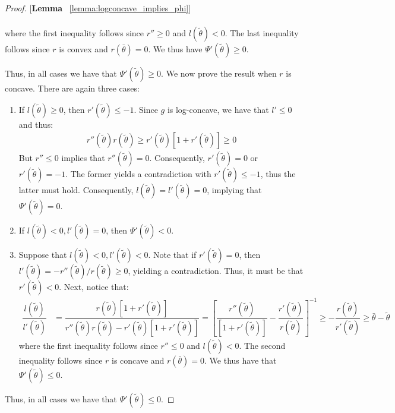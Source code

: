 \begin{proof}{[\textbf{Lemma} ~\ref{lemma:logconcave_implies_phi}]}
\begin{enumerate}[label=(\arabic*),ref=\thelemma(\arabic*)]
\begin{align*}
   \end{align*}
   where the first inequality follows since $r''\geq 0$ and $l(\tilde{\theta})<0$. The last inequality follows since $r$ is convex and $r(\bar{\theta})=0$. We thus have $\Psi'(\tilde{\theta})\geq 0$. 
\end{enumerate}
Thus, in all cases we have that $\Psi'(\tilde{\theta})\geq 0$. We now prove the result when $r$ is concave. There are again three cases:
\vspace{-5pt}
\begin{enumerate}[label=(\arabic*),ref=\thelemma(\arabic*)]
   \item If $l(\tilde{\theta})\geq 0$, then $r'(\tilde{\theta})\leq -1$. Since $g$ is log-concave, we have that $l'\leq0$ and thus: 
   \begin{align*}
      r''(\tilde{\theta})r(\tilde{\theta})\geq r'(\tilde{\theta})[1+r'(\tilde{\theta})] \geq 0
   \end{align*}
   But $r''\leq 0$ implies that $r''(\tilde{\theta}) = 0$. Consequently, $r'(\tilde{\theta}) = 0$ or $r'(\tilde{\theta})=-1$. The former yields a contradiction with $r'(\tilde{\theta})\leq -1$, thus the latter must hold. Consequently, $l(\tilde{\theta})=l'(\tilde{\theta})=0$, implying that $\Psi'(\tilde{\theta})=0$. 
   \item If $l(\tilde{\theta})<0,l'(\tilde{\theta})=0$, then $\Psi'(\tilde{\theta})<0$. 
   \item Suppose that $l(\tilde{\theta})<0,l'(\tilde{\theta})<0$. Note that if $r'(\tilde{\theta})=0$, then $l'(\tilde{\theta}) = -r''(\tilde{\theta})/r(\tilde{\theta})\geq 0$, yielding a contradiction. Thus, it must be that $r'(\tilde{\theta})<0$. Next, notice that:
   \begin{align*}
      \dfrac{l(\tilde{\theta})}{l'(\tilde{\theta})} &= \dfrac{r(\tilde{\theta})[1+r'(\tilde{\theta})]}{r''(\tilde{\theta})r(\tilde{\theta}) - r'(\tilde{\theta})[1+r'(\tilde{\theta})]} = \left[\dfrac{r''(\tilde{\theta})}{[1+r'(\tilde{\theta})]} - \dfrac{r'(\tilde{\theta})}{r(\tilde{\theta})}\right]^{-1} \geq -\dfrac{r(\tilde{\theta})}{r'(\tilde{\theta})} \geq \bar{\theta}-\tilde{\theta}
   \end{align*}
   where the first inequality follows since $r''\leq 0$ and $l(\tilde{\theta})<0$. The second inequality follows since $r$ is concave and $r(\bar{\theta})=0$. We thus have that $\Psi'(\tilde{\theta})\leq0$. 
\end{enumerate}
Thus, in all cases we have that $\Psi'(\tilde{\theta})\leq0$. 
\end{proof}

